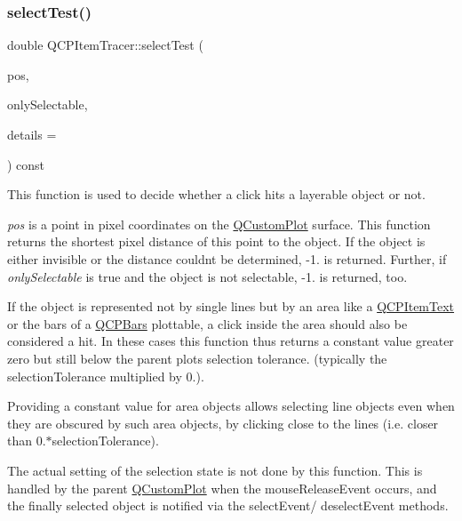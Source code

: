 \subsubsection{\texorpdfstring{selectTest()}{selectTest()}}
{\footnotesize\ttfamily double Q\+C\+P\+Item\+Tracer\+::select\+Test (\begin{DoxyParamCaption}\item[{const Q\+PointF \&}]{pos,  }\item[{bool}]{only\+Selectable,  }\item[{Q\+Variant $\ast$}]{details = {} }\end{DoxyParamCaption}) const\hspace{0.3cm}{\ttfamily [virtual]}}

This function is used to decide whether a click hits a layerable object or not.

{\itshape pos} is a point in pixel coordinates on the \mbox{\hyperlink{class_q_custom_plot}{Q\+Custom\+Plot}} surface. This function returns the shortest pixel distance of this point to the object. If the object is either invisible or the distance couldn\textquotesingle{}t be determined, -\/1. is returned. Further, if {\itshape only\+Selectable} is true and the object is not selectable, -\/1. is returned, too.

If the object is represented not by single lines but by an area like a \mbox{\hyperlink{class_q_c_p_item_text}{Q\+C\+P\+Item\+Text}} or the bars of a \mbox{\hyperlink{class_q_c_p_bars}{Q\+C\+P\+Bars}} plottable, a click inside the area should also be considered a hit. In these cases this function thus returns a constant value greater zero but still below the parent plot\textquotesingle{}s selection tolerance. (typically the selection\+Tolerance multiplied by 0.).

Providing a constant value for area objects allows selecting line objects even when they are obscured by such area objects, by clicking close to the lines (i.\+e. closer than 0.$\ast$selection\+Tolerance).

The actual setting of the selection state is not done by this function. This is handled by the parent \mbox{\hyperlink{class_q_custom_plot}{Q\+Custom\+Plot}} when the mouse\+Release\+Event occurs, and the finally selected object is notified via the select\+Event/ deselect\+Event methods.

